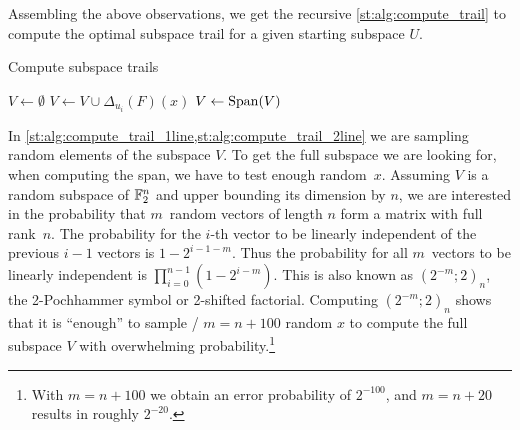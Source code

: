 Assembling the above observations, we get the recursive \cref{st:alg:compute_trail} to compute the optimal subspace trail for a given starting subspace $U$.
\begin{algorithm}
\caption{Compute subspace trails}\label{st:alg:compute_trail}
\begin{algorithmic}[1]
    \Statex{}
        \State{}
    \EndIf{}
    \State{}$V \leftarrow \emptyset$
        \label{st:alg:compute_trail_1line}
            \State{} $V \leftarrow V \cup \Delta_{u_i}(F)(x)$\label{st:alg:compute_trail_2line}
        \EndFor{}
    \EndFor{}
    \State{}$V \leftarrow \operatorname{Span}(V)$
    \State{}
    \EndFunction{}
\end{algorithmic}
\end{algorithm}
In \cref{st:alg:compute_trail_1line,st:alg:compute_trail_2line} we are sampling random elements of the subspace $V$.
To get the full subspace we are looking for, when computing the span, we have to test enough random~$x$.
Assuming $V$ is a random subspace of $\mathbb{F}_2^n$ and upper bounding its dimension by $n$, we are interested in the probability that $m$~random vectors of length $n$ form a matrix with full rank~$n$.
The probability for the $i$-th vector to be linearly independent of the previous $i-1$ vectors is $1-2^{i-1-m}$.
Thus the probability for all $m$~vectors to be linearly independent is $\prod_{i=0}^{n-1}(1-2^{i-m})$.
This is also known as ${(2^{-m}; 2)}_n$, the 2-Pochhammer symbol or 2-shifted factorial.
Computing ${(2^{-m}; 2)}_n$ shows that it is \enquote{enough} to sample \eg/ $m = n+100$ random $x$ to compute the full subspace $V$ with overwhelming probability.\footnote{%
    With $m = n+100$ we obtain an error probability of $2^{-100}$, and $m=n+20$ results in roughly $2^{-20}$.
}

